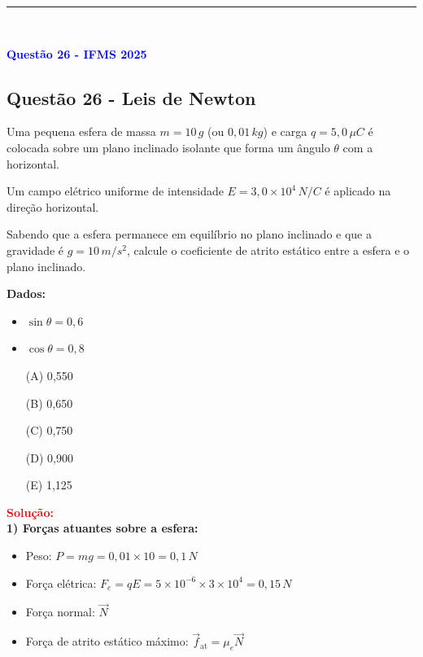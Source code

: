 \noindent\rule{\linewidth}{0.6pt}\\

\begin{flushleft}
\textbf{\textcolor{blue}{\Large Quest\~ao 26 - IFMS 2025}}\\
\subsection{Quest\~ao 26 - Leis de Newton}
Uma pequena esfera de massa $m = 10\,g$ (ou $0{,}01\,kg$) e carga $q = 5,0\,\mu C$ é colocada sobre um plano inclinado isolante 
que forma um ângulo $\theta$ com a horizontal. 

Um campo elétrico uniforme de intensidade $E = 3,0 \times 10^4\,N/C$ é aplicado na direção horizontal.

Sabendo que a esfera permanece em equilíbrio no plano inclinado e que a gravidade é $g = 10\,m/s^2$, calcule o coeficiente de atrito 
estático entre a esfera e o plano inclinado.

\textbf{Dados:}

\begin{itemize}
\item $\sin\theta = 0{,}6$
\item $\cos\theta = 0{,}8$
\end{itemize}

\begin{itemize}
\item[(A)] 0{,}550
\item[(B)] 0{,}650  
\item[(C)] 0{,}750
\item[(D)] 0{,}900
\item[(E)] 1,125
\end{itemize}

\vspace{0.5cm}

\textcolor{red}{\textbf{Solução:}}\\

\textbf{1) Forças atuantes sobre a esfera:}

\begin{itemize}
\item Peso: $P = mg = 0{,}01 \times 10 = 0{,}1\,N$
\item Força elétrica: $F_e = qE = 5 \times 10^{-6} \times 3 \times 10^4 = 0{,}15\,N$
\item Força normal: $\vec{N}$
\item Força de atrito estático máximo: $\vec{f}_{\text{at}} = \mu_e \vec{N}$
\end{itemize}


\end{flushleft}

